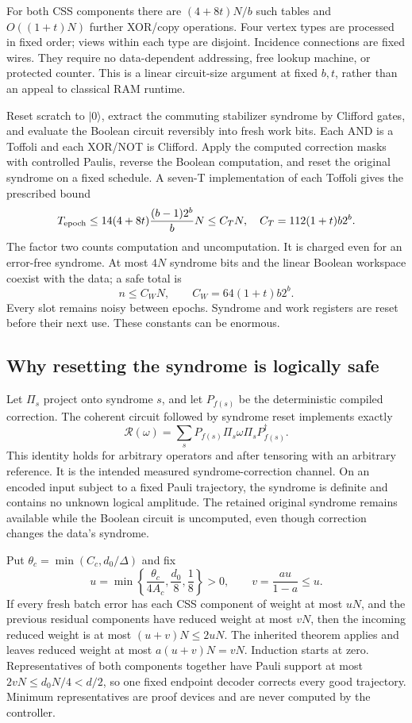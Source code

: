 \documentclass[11pt,a4paper]{article}
\numberwithin{equation}{section}
\theoremstyle{remark}\newtheorem*{remark}{Interpretation}
\newcommand{\ket}[1]{\lvert#1\rangle}
\begin{document}
For both CSS components there are $(4+8t)N/b$ such tables and $O((1+t)N)$ further XOR/copy operations. Four vertex types are processed in fixed order; views within each type are disjoint. Incidence connections are fixed wires. They require no data-dependent addressing, free lookup machine, or protected counter. This is a linear circuit-size argument at fixed $b,t$, rather than an appeal to classical RAM runtime.

Reset scratch to $\ket0$, extract the commuting stabilizer syndrome by Clifford gates, and evaluate the Boolean circuit reversibly into fresh work bits. Each AND is a Toffoli and each XOR/NOT is Clifford. Apply the computed correction masks with controlled Paulis, reverse the Boolean computation, and reset the original syndrome on a fixed schedule. A seven-T implementation of each Toffoli gives the prescribed bound
\[
T_{\rm epoch}\le14(4+8t)\frac{(b-1)2^b}{b}N\le C_TN,
\quad C_T=112(1+t)b2^b.
\]
The factor two counts computation and uncomputation. It is charged even for an error-free syndrome. At most $4N$ syndrome bits and the linear Boolean workspace coexist with the data; a safe total is
\[
n\le C_WN,\qquad C_W=64(1+t)b2^b.
\]
Every slot remains noisy between epochs. Syndrome and work registers are reset before their next use. These constants can be enormous.

\subsection{Why resetting the syndrome is logically safe}
Let $\Pi_s$ project onto syndrome $s$, and let $P_{f(s)}$ be the deterministic compiled correction. The coherent circuit followed by syndrome reset implements exactly
\[
\mathcal R(\omega)=\sum_sP_{f(s)}\Pi_s\omega\Pi_sP_{f(s)}^\dagger.
\]
This identity holds for arbitrary operators and after tensoring with an arbitrary reference. It is the intended measured syndrome-correction channel. On an encoded input subject to a fixed Pauli trajectory, the syndrome is definite and contains no unknown logical amplitude. The retained original syndrome remains available while the Boolean circuit is uncomputed, even though correction changes the data's syndrome.

Put $\theta_c=\min(C_c,d_0/\Delta)$ and fix
\[
u=\min\left\{\frac{\theta_c}{4A_c},\frac{d_0}{8},\frac18\right\}>0,
\qquad v=\frac{au}{1-a}\le u.
\]
If every fresh batch error has each CSS component of weight at most $uN$, and the previous residual components have reduced weight at most $vN$, then the incoming reduced weight is at most $(u+v)N\le2uN$. The inherited theorem applies and leaves reduced weight at most $a(u+v)N=vN$. Induction starts at zero. Representatives of both components together have Pauli support at most $2vN\le d_0N/4<d/2$, so one fixed endpoint decoder corrects every good trajectory. Minimum representatives are proof devices and are never computed by the controller.
\end{document}
